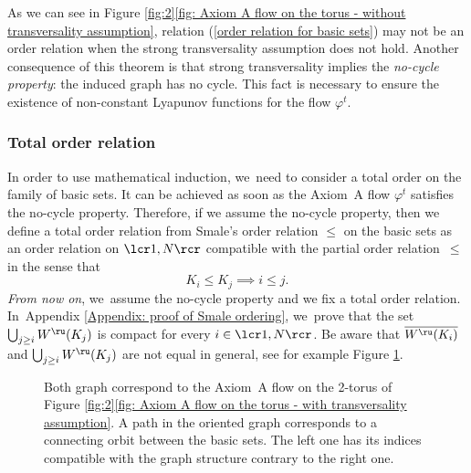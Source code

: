 As we can see in Figure \ref{fig:2}\eqref{fig: Axiom A flow on the torus - without transversality assumption}, relation (\ref{order relation for basic sets}) may not be an order relation when the strong transversality assumption does not hold.
Another consequence of this theorem is that strong transversality implies the \textit{no-cycle property}: the induced graph has no cycle. This fact is necessary to ensure the existence of non-constant Lyapunov functions for the flow $\varphi^t$.

\subsubsection{Total order relation}\label{subsubsection total order relation}

In order to use mathematical induction, we~need to consider a total order on the family of basic sets. It can be achieved as soon as the Axiom~A flow $\varphi^t$ satisfies the no-cycle property. Therefore, if we assume the no-cycle property, then we define a total order relation from Smale's order relation $\leq$ on the basic sets as an order relation on $\lcr1,N\rcr$ compatible with the partial order relation~$\leq$ in the sense that
\begin{equation}\label{eq: total order relation, indices compatible}
K_i \leq K_j \implies i \leq j.
\end{equation}
\emph{From now on}, we~assume the no-cycle property and we fix a total order relation. In~Appendix \ref{Appendix: proof of Smale ordering}, we~prove that the set $\bigcup_{j\geq i }W^\ru (K_j)$ is compact for every $i\in\lcr1,N\rcr$. Be aware that $\overline{W^\ru (K_i)}$ and $\bigcup_{j\geq i }W^\ru (K_j)$ are not equal in general, see for example Figure \ref{fig: graph structures on the 2 torus}.

\begin{figure}[t]
\begin{minipage}[c]{.46\linewidth}
\centering
\def\svgscale{0.6}

\end{minipage}
\begin{minipage}[c]{.46\linewidth}
\centering
\def\svgscale{0.6}

\end{minipage}
\caption{Both graph correspond to the Axiom~A flow on the \hbox{2-torus} of Figure \ref{fig:2}\eqref{fig: Axiom A flow on the torus - with transversality assumption}. A path in the oriented graph corresponds to a connecting orbit between the basic sets. The left one has its indices compatible with the graph structure contrary to the right one.}
\label{fig: graph structures on the 2 torus}
\end{figure}

